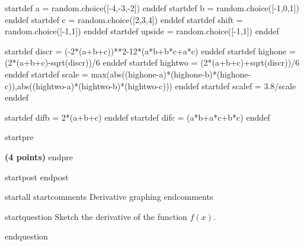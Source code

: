 startdef a = random.choice([-4,-3,-2]) enddef
startdef b = random.choice([-1,0,1]) enddef
startdef c = random.choice([2,3,4]) enddef
startdef shift = random.choice([-1,1]) enddef
startdef upside = random.choice([-1,1]) enddef

startdef discr = (-2*(a+b+c))**2-12*(a*b+b*c+a*c) enddef
startdef highone = (2*(a+b+c)-sqrt(discr))/6 enddef
startdef hightwo = (2*(a+b+c)+sqrt(discr))/6 enddef
startdef scale = max(abs((highone-a)*(highone-b)*(highone-c)),abs((hightwo-a)*(hightwo-b)*(hightwo-c))) enddef
startdef scalef = 3.8/scale enddef

startdef difb = 2*(a+b+c) enddef
startdef difc = (a*b+a*c+b*c) enddef

startpre
\item {\bf (4 points)} 
endpre

startpost
\vspace{2cm}
endpost



startall
startcomments 
Derivative graphing
endcomments

startquestion Sketch the derivative of the function $f(x)$.

\begin{multicols}{2}

 \end{multicols}
endquestion

